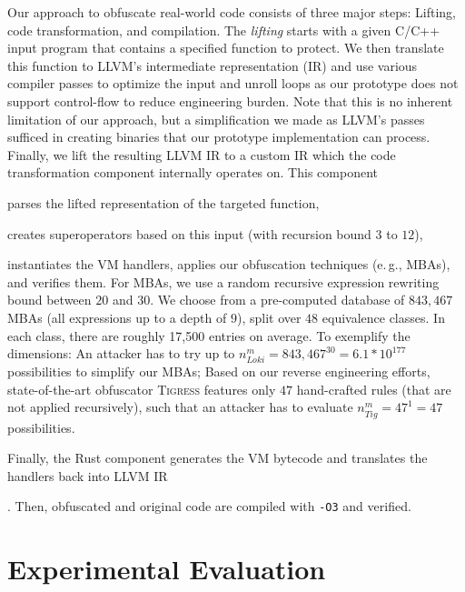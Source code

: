 \documentclass[letterpaper,twocolumn,10pt]{article}
\newcommand{\eg}{e.\,g.,\xspace}
\theoremstyle{customexample}
\theoremstyle{customexperiment}
\newcommand{\tigress}{\textsc{Tigress}\xspace}
\newcommand{\llvm}{{\textsc{LLVM}}\xspace}
\begin{document}
Our approach to obfuscate real-world code consists of three major steps: Lifting, code transformation, and compilation. The \emph{lifting} starts with a given C/C++ input program that contains a specified function to protect. 
We then translate this function to \llvm's intermediate representation (IR) and use various compiler passes to optimize the input and unroll loops as our prototype does not support control-flow to reduce engineering burden. Note that this is no inherent limitation of our approach, but a simplification we made as \llvm's passes sufficed in creating binaries that our prototype implementation can process.
Finally, we lift the resulting LLVM IR to a custom IR which the code transformation component internally operates on. This component \begin{inparaenum}[(a)]
\item parses the lifted representation of the targeted function,
\item creates superoperators based on this input (with recursion bound $3$ to $12$),
\item instantiates the VM handlers, applies our obfuscation techniques (\eg MBAs), and verifies them. 
For MBAs, we use a random recursive expression rewriting bound between $20$ and $30$. We choose from a pre-computed database of $843,467$ MBAs (all expressions up to a depth of $9$), split over $48$ equivalence classes. In each class, there are roughly 17,500 entries on average.
To exemplify the dimensions: An attacker has to try up to $n_{Loki}^m = 843,467^{30} = 6.1*10^{177}$ possibilities to simplify our MBAs; Based on our reverse engineering efforts, state-of-the-art obfuscator \tigress features only $47$ hand-crafted rules (that are not applied recursively), such that an attacker has to evaluate $n_{Tig}^{m} = 47^1 = 47$ possibilities.
\item Finally, the Rust component generates the VM bytecode and translates the handlers back into \llvm IR\end{inparaenum}.
Then, obfuscated and original code are compiled with \texttt{-O3} and verified.












 \section{Experimental Evaluation}\label{sec:evaluation}
\end{document}
